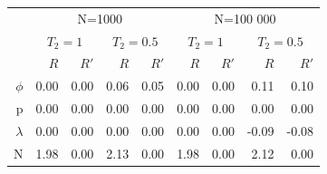 \documentclass[12pt]{article}
\begin{document}
\begin{table}[ht]
\centering
\begin{tabular}{rrrrrrrrr}
  \hline
 
  & \multicolumn{4}{c}{N=1000} & \multicolumn{4}{c}{N=100 000} \\

 &\multicolumn{2}{c}{$T_2=1$}  &\multicolumn{2}{c}{$T_2=0.5$} &\multicolumn{2}{c}{$T_2=1$} &\multicolumn{2}{c}{$T_2=0.5$}\\ 

&$R$   &$R'$   &$R$   &$R'$   &$R$   &$R'$   &$R$   &$R'$\\ 
  \hline
$\phi$ & 0.00 & 0.00 & 0.06 & 0.05 & 0.00 & 0.00 & 0.11 & 0.10 \\ 
  p & 0.00 & 0.00 & 0.00 & 0.00 & 0.00 & 0.00 & 0.00 & 0.00 \\ 
  $\lambda$ & 0.00 & 0.00 & 0.00 & 0.00 & 0.00 & 0.00 & -0.09 & -0.08 \\ 
  N & 1.98 & 0.00 & 2.13 & 0.00 & 1.98 & 0.00 & 2.12 & 0.00 \\ 
   \hline
\end{tabular}
\end{table}

~ ~
\end{document}
